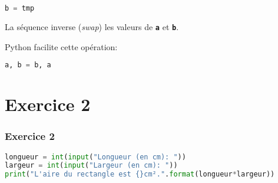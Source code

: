 \documentclass[svgnames,11pt]{beamer}
\begin{document}
\begin{frame}[fragile]
    \begin{lstlisting}[language=Python , basicstyle=\ttfamily\small, xleftmargin=2em, xrightmargin=2em]
b = tmp
\end{lstlisting}
    \begin{center}
    \end{center}
\begin{aretenir}[]
La séquence inverse (\emph{swap}) les valeurs de \textbf{\texttt{a}} et \textbf{\texttt{b}}.
\end{aretenir}
\begin{aretenir}[Remarque]
    Python facilite cette opération:
    \begin{lstlisting}[language=Python , basicstyle=\ttfamily\small, xleftmargin=2em, xrightmargin=2em]
a, b = b, a
\end{lstlisting}
    \end{aretenir}
\end{frame}
\section{Exercice 2}
\begin{frame}[fragile]
    \frametitle{Exercice 2}

\begin{center}
\begin{lstlisting}[language=Python , basicstyle=\ttfamily\small, xleftmargin=1em, xrightmargin=1em]
longueur = int(input("Longueur (en cm): "))
largeur = int(input("Largeur (en cm): "))
print("L'aire du rectangle est {}cm².".format(longueur*largeur))
\end{lstlisting}
\label{CODE}
\end{center}

\end{frame}
\end{document}
